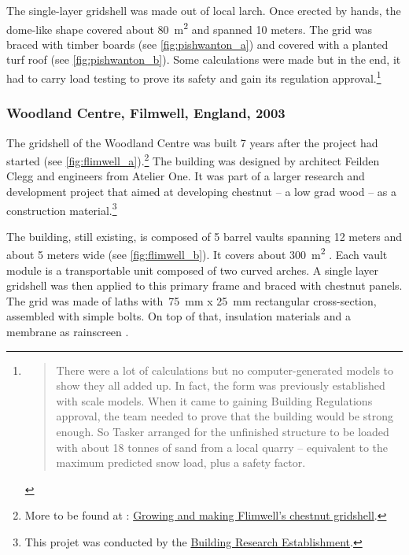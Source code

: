 The single-layer gridshell was made out of local larch. Once erected by hands, the dome-like shape covered about \SI{80}{m^2} and spanned 10 meters. The grid was braced with timber boards (see \cref{fig:pishwanton_a}) and covered with a planted turf roof (see \cref{fig:pishwanton_b}). Some calculations were made but in the end, it had to carry load testing to prove its safety and gain its regulation approval.\footnote{\blockcquote[]{bdonline2002}{There were a lot of calculations but no computer-generated models to show they all added up. In fact, the form was previously established with scale models. When it came to gaining Building Regulations approval, the team needed to prove that the building would be strong enough. So Tasker arranged for the unfinished structure to be loaded with about 18 tonnes of sand from a local quarry – equivalent to the maximum predicted snow load, plus a safety factor.}}

\subsubsection{Woodland Centre, Filmwell, England, 2003}
The gridshell of the Woodland Centre was built 7 years after the project had started (see \cref{fig:flimwell_a}).\footnote{More to be found at : \href{http://www.fourthdoor.org/annular/?page_id=441}{Growing and making Flimwell’s chestnut gridshell}.} The building was designed by architect Feilden Clegg and engineers from Atelier One. It was part of a larger research and development project that aimed at developing chestnut -- a low grad wood -- as a construction material.\footnote{This projet was conducted by the \href{http://www.bre.co.uk/}{Building Research Establishment}.}

The building, still existing, is composed of 5 barrel vaults spanning 12 meters and about 5 meters wide (see \cref{fig:flimwell_b}). It covers about \SI{300}{m^2} \cite{Lowenstein2004}. Each vault module is a transportable unit composed of two curved arches. A single layer gridshell was then applied to this primary frame and braced with chestnut panels. The grid was made of laths with~\SI{75}{mm} x \SI{25}{mm} rectangular cross-section, assembled with simple bolts. On top of that, insulation materials and a membrane as rainscreen \cite{FourthDoor2003}.


